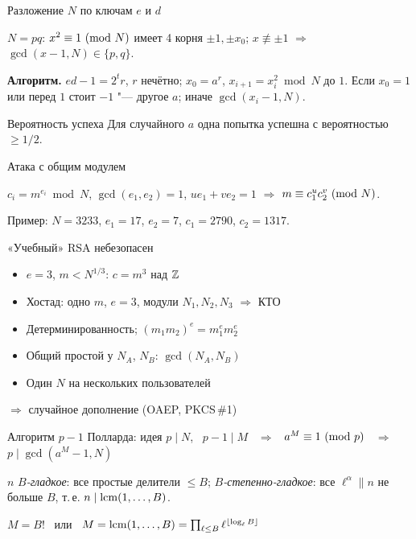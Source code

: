 \documentclass{ca-slides}
\begin{document}
\begin{canvasframe}{Разложение $N$ по ключам $e$ и $d$}
  \small
  \begin{lemma}
    $N = pq$: $x^2 \equiv 1 \ (\mathrm{mod}\ N)$ имеет 4 корня $\pm 1, \pm x_0$;
    $x \not\equiv \pm 1$ $\Rightarrow$ $\gcd(x - 1, N) \in \{p, q\}$.
  \end{lemma}
  \textbf{Алгоритм.} $ed - 1 = 2^t r$, $r$ нечётно; $x_0 = a^r$, $x_{i+1} = x_i^2 \bmod N$
  до $1$. Если $x_0 = 1$ или перед $1$ стоит $-1$ "--- другое $a$; иначе
  $\gcd(x_i - 1, N)$.
\end{canvasframe}

\begin{theoremframe}{Вероятность успеха}
  Для случайного $a$ одна попытка успешна с вероятностью $\ge 1/2$.
\end{theoremframe}

\begin{canvasframe}{Атака с общим модулем}
  \small
  \begin{proposition}
    $c_i = m^{e_i} \bmod N$, $\gcd(e_1, e_2) = 1$, $u e_1 + v e_2 = 1$
    $\Rightarrow$ $m \equiv c_1^u c_2^v \ (\mathrm{mod}\ N)$.
  \end{proposition}
  Пример: $N = 3233$, $e_1 = 17$, $e_2 = 7$, $c_1 = 2790$, $c_2 = 1317$.
  \penspace[0.25\textheight]
\end{canvasframe}

\begin{canvasframe}{«Учебный» RSA небезопасен}
  \small
  \begin{itemize}
    \item $e = 3$, $m < N^{1/3}$: $c = m^3$ над $\mathbb{Z}$
    \item Хостад: одно $m$, $e = 3$, модули $N_1, N_2, N_3$ $\Rightarrow$ КТО
    \item Детерминированность; $(m_1 m_2)^e = m_1^e m_2^e$
    \item Общий простой у $N_A$, $N_B$: $\gcd(N_A, N_B)$
    \item Один $N$ на нескольких пользователей
  \end{itemize}
  $\Rightarrow$ случайное дополнение (OAEP, PKCS\,\#1)
\end{canvasframe}

\begin{canvasframe}{Алгоритм $p - 1$ Полларда: идея}
  \small
  $p \mid N$, \ $p - 1 \mid M$ \ $\Rightarrow$ \ $a^M \equiv 1 \ (\mathrm{mod}\ p)$ \ $\Rightarrow$ \
  $p \mid \gcd(a^M - 1, N)$
  \begin{definition}
    $n$ \emph{$B$-гладкое}: все простые делители $\le B$;
    \emph{$B$-степенно-гладкое}: все $\ell^\alpha \parallel n$ не больше $B$,
    т.\,е. $n \mid \operatorname{lcm}(1, \dots, B)$.
  \end{definition}
  $M = B!$ \ или \ $M = \operatorname{lcm}(1, \dots, B) = \prod_{\ell \le B} \ell^{\lfloor\log_\ell B\rfloor}$
  \aside{$1200 = 2^4 \cdot 3 \cdot 5^2$?}
\end{canvasframe}
\end{document}
